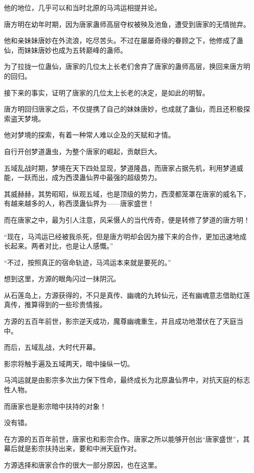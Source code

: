 \begin{this_body}
他的地位，几乎可以和当时北原的马鸿运相提并论。

唐方明在幼年时期，因为唐家蛊师高层夺权被殃及池鱼，遭受到唐家的无情抛弃。

他和亲妹妹唐妙在外流浪，吃尽苦头。不过在屡屡奇缘的眷顾之下，他修成了蛊仙，而妹妹唐妙也成为五转巅峰的蛊师。

为了拉拢一位蛊仙，唐家的几位太上长老们舍弃了唐家的蛊师高层，换回来唐方明的回归。

接下来的事实，证明了唐家的几位太上长老的决定，是如此的明智。

唐方明回归唐家之后，不仅提携了自己的妹妹唐妙，也成就了蛊仙，而且还积极探索盗天梦境。

他对梦境的探索，有着一种常人难以企及的天赋和才情。

自行开创梦道蛊虫，为整个唐家的崛起，贡献巨大。

五域乱战时期，梦境在天下四处显现，梦道隆昌，而唐家占据先机，利用梦道威能，一跃而出，成为西漠蛊仙界中最强的超级势力。

其威赫赫，其势昭昭，纵观五域，也是顶级的势力，西漠都笼罩在唐家的威名下，有越来越多的人，称西漠蛊仙界为——唐家盛世！

而在唐家之中，最为引人注意，风采慑人的当代传奇，便是转修了梦道的唐方明！

“现在，马鸿运已经被我杀死，但是唐方明却会因为接下来的合作，更加迅速地成长起来。两者对比，也是让人感慨。”

“不过，按照真正的宿命轨迹，马鸿运本来就是要死的。”

想到这里，方源的眼角闪过一抹阴沉。

从石莲岛上，方源获得的，不只是真传、幽魂的九转仙元，还有幽魂意志借助红莲真传，推算得到的一些珍贵情报。

方源的五百年前世，影宗逆天成功，魔尊幽魂重生，并且成功地潜伏在了天庭当中。

而后，五域乱战，大时代开幕。

影宗将触手遍及五域两天，暗中操纵一切。

马鸿运就是由影宗多次出力保下性命，最终成长为北原蛊仙界中，对抗天庭的标志性人物。

而唐家也是影宗暗中扶持的对象！

没有错。

在方源的五百年前世，唐家也和影宗合作。唐家之所以能够开创出“唐家盛世”，其幕后就是影宗扶持出来，要和中洲天庭作对。

方源选择和唐家合作的很大一部分原因，也在这里。


\end{this_body}
